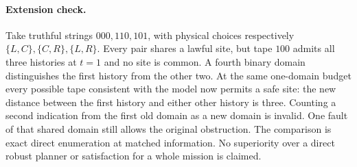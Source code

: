 \documentclass{article}
\begin{document}
\paragraph{Extension check.}
Take truthful strings $000,110,101$, with physical choices respectively
$\{L,C\},\{C,R\},\{L,R\}$. Every pair shares a lawful site, but
tape $100$ admits all three histories at $t=1$ and no site is common.
A fourth binary domain distinguishes the first history from the other
two. At the same one-domain budget every possible tape consistent
with the model now permits a safe site: the new distance between the
first history and either other history is three. Counting a second
indication from the first old domain as a new domain is invalid.
One fault of that shared domain still allows the original obstruction.
The comparison is exact direct enumeration at matched information.
No superiority over a direct robust planner or satisfaction for a
whole mission is claimed.
\end{document}
